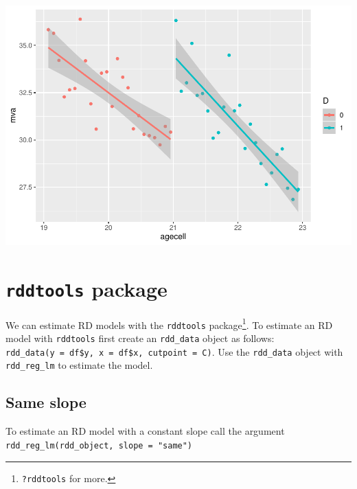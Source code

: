 \documentclass[]{book}
\newenvironment{Shaded}{\begin{snugshade}}{\end{snugshade}}
\newcommand{\DataTypeTok}[1]{\textcolor[rgb]{0.13,0.29,0.53}{#1}}
\newcommand{\DecValTok}[1]{\textcolor[rgb]{0.00,0.00,0.81}{#1}}
\newcommand{\KeywordTok}[1]{\textcolor[rgb]{0.13,0.29,0.53}{\textbf{#1}}}
\newcommand{\NormalTok}[1]{#1}
\newcommand{\OperatorTok}[1]{\textcolor[rgb]{0.81,0.36,0.00}{\textbf{#1}}}
\newcommand{\StringTok}[1]{\textcolor[rgb]{0.31,0.60,0.02}{#1}}
\let\rmarkdownfootnote\footnote%
\def\footnote{\protect\rmarkdownfootnote}
\begin{document}
\includegraphics{bailey_files/figure-latex/unnamed-chunk-119-2.pdf}

\hypertarget{rddtools-package}{%
\section{\texorpdfstring{\texttt{rddtools} package}{rddtools package}}\label{rddtools-package}}

We can estimate RD models with the \texttt{rddtools} package\footnote{\texttt{?rddtools} for more.}. To estimate an RD model with \texttt{rddtools} first create an \texttt{rdd\_data} object as follows: \texttt{rdd\_data(y\ =\ df\$y,\ x\ =\ df\$x,\ cutpoint\ =\ C)}. Use the \texttt{rdd\_data} object with \texttt{rdd\_reg\_lm} to estimate the model.

\hypertarget{same-slope-1}{%
\subsection{Same slope}\label{same-slope-1}}

To estimate an RD model with a constant slope call the argument \texttt{rdd\_reg\_lm(rdd\_object,\ slope\ =\ "same")}

\begin{Shaded}
\end{Shaded}
\end{document}
